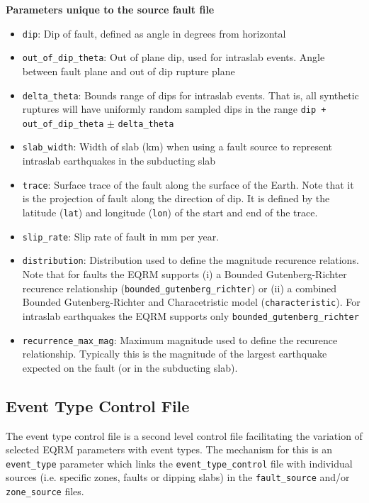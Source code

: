 \textbf{Parameters unique to the source fault file}
\begin{itemize}
\item \texttt{dip}: Dip of fault, defined as angle in degrees from horizontal
\item \texttt{out\_of\_dip\_theta}: Out of plane dip, used for intraslab events. Angle between fault plane
and out of dip rupture plane
\item \texttt{delta\_theta}: Bounds range of dips for intraslab events. That is,
all synthetic ruptures will have uniformly random sampled dips in
the range \texttt{dip + out\_of\_dip\_theta} $\pm$
\texttt{delta\_theta}
\item \texttt{slab\_width}: Width of slab (km) when using a fault source to represent intraslab
earthquakes in the subducting slab
\item \texttt{trace}: Surface trace of the fault along the surface
of the Earth. Note that it is the projection of fault along the
direction of dip. It is defined by the latitude (\texttt{lat}) and
longitude (\texttt{lon}) of the start and end of the trace.
\item \texttt{slip\_rate}: Slip rate of fault in mm per year.
\item \texttt{distribution}: Distribution used to define the magnitude recurence relations. Note that
for faults the EQRM supports (i) a Bounded Gutenberg-Richter
recurence relationship
(\texttt{bounded}\texttt{\_gutenberg}\texttt{\_richter}) or (ii) a
combined Bounded Gutenberg-Richter and Characetristic model
(\texttt{characteristic}). For intraslab earthquakes the EQRM
supports only \texttt{bounded}\texttt{\_gutenberg}\texttt{\_richter}
\item \texttt{recurrence\_max\_mag}: Maximum magnitude used to
define the recurence relationship. Typically this is the magnitude
of the largest earthquake expected on the fault (or in the
subducting slab).
\end{itemize}

\subsection{Event Type Control File}

The event type control file is a second level control file
facilitating the variation of selected EQRM parameters with event
types. The mechanism for this is an \texttt{event\_type} parameter
which links the \texttt{event\_type\_control} file with individual
sources (i.e. specific zones, faults or dipping slabs) in the
\texttt{fault\_source} and/or \texttt{zone\_source} files.


